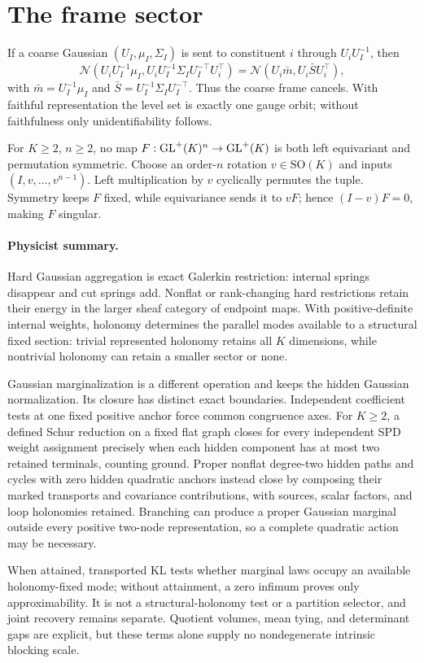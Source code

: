 \section{The frame sector}
\label{sec:cg-frame}

If a coarse Gaussian \((U_I,\mu_I,\Sigma_I)\) is sent to constituent \(i\)
through \(U_iU_I^{-1}\), then
\begin{equation}
\mathcal N(U_iU_I^{-1}\mu_I,
U_iU_I^{-1}\Sigma_IU_I^{-\top}U_i^\top)
=\mathcal N(U_i\bar m,U_i\bar S U_i^\top),
\label{eq:cg-frame-cancellation}
\end{equation}
with \(\bar m=U_I^{-1}\mu_I\) and
\(\bar S=U_I^{-1}\Sigma_IU_I^{-\top}\).
Thus the coarse frame cancels. With faithful representation the level set is
exactly one gauge orbit; without faithfulness only unidentifiability follows.

For \(K\geq2\), \(n\geq2\), no map
\(F:\mathrm{GL}^+(K)^n\to\mathrm{GL}^+(K)\) is both left equivariant and permutation
symmetric. Choose an order-\(n\) rotation \(v\in\mathrm{SO}(K)\) and inputs
\((I,v,\ldots,v^{n-1})\). Left multiplication by \(v\) cyclically permutes
the tuple. Symmetry keeps \(F\) fixed, while equivariance sends it to \(vF\);
hence \((I-v)F=0\), making \(F\) singular. 

\paragraph{Physicist summary.}
Hard Gaussian aggregation is exact Galerkin restriction: internal springs
disappear and cut springs add. Nonflat or rank-changing hard restrictions
retain their energy in the larger sheaf category of endpoint maps.
With positive-definite internal weights, holonomy determines the parallel
modes available to a structural fixed section: trivial represented
holonomy retains all \(K\) dimensions, while nontrivial holonomy can
retain a smaller sector or none. 

Gaussian marginalization is a different operation and keeps the hidden
Gaussian normalization. Its closure has distinct exact boundaries.
Independent coefficient tests at one fixed positive anchor force common
congruence axes. For \(K\geq2\), a defined Schur reduction on a fixed
flat graph closes for every independent SPD weight assignment precisely
when each hidden component has at most two retained terminals, counting
ground. Proper nonflat degree-two hidden paths and cycles with zero
hidden quadratic anchors instead close by composing their marked
transports and covariance contributions, with sources, scalar factors,
and loop holonomies retained. Branching can produce a proper Gaussian
marginal outside every positive two-node representation, so a complete
quadratic action may be necessary.

When attained, transported KL tests whether marginal laws occupy an
available holonomy-fixed mode; without attainment, a zero infimum proves
only approximability. It is not a structural-holonomy test or a partition
selector, and joint recovery remains separate. Quotient volumes, mean
tying, and determinant gaps are explicit, but these terms alone supply
no nondegenerate intrinsic blocking scale. 
